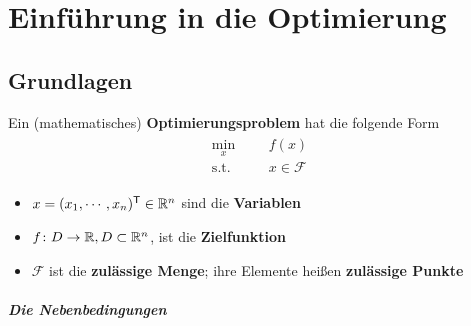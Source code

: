 \chapter{Einf\"uhrung in die Optimierung}

\section{Grundlagen}

\begin{Definition}
	\begin{center}
	Ein (mathematisches) \textbf {Optimierungsproblem} hat die folgende Form\\
	\begin{gather}
  		\label{eq:P}   
  		\tag{P}
  			\begin{aligned}
    			\min_x
    			& & & f(x) \\
    			\text{s.t.}
    			& & & x\in \mathcal{F}
  			\end{aligned}
	\end{gather}
	\begin{itemize}
		\item  	$x=(x_1,\cdots,x_n)^\mathsf{T}\in\mathbb R^n$ sind die \textbf{Variablen}
		\item	$f\colon D\to\mathbb R, D\subset\mathbb R^n$, ist die \textbf{Zielfunktion}
		\item	$\mathcal{F}$ ist die \textbf{zul\"assige Menge}; ihre Elemente hei\ss en \textbf{zul\"assige Punkte}\qedhere
\end{itemize}
\end{center}
\end{Definition}

\paragraph{Die Nebenbedingungen}


